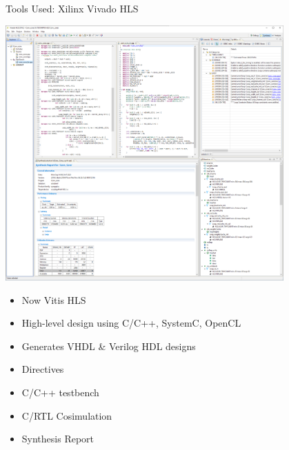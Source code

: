 \begin{frame}{Tools Used: Xilinx Vivado HLS}
	\begin{minipage}{0.6\textwidth}
		\centering
		\includegraphics[width=0.8\textwidth]{../Images/Platform/Vivado-HLS.png}\\
	\end{minipage}%
	\begin{minipage}{0.4\textwidth}
		\begin{itemize}
			\item Now Vitis HLS
			\item High-level design using C/C++, SystemC, OpenCL
			\item Generates VHDL \& Verilog HDL designs
			\item Directives
			\item C/C++ testbench
			\item C/RTL Cosimulation
			\item Synthesis Report
		\end{itemize}
	\end{minipage}
\end{frame}

